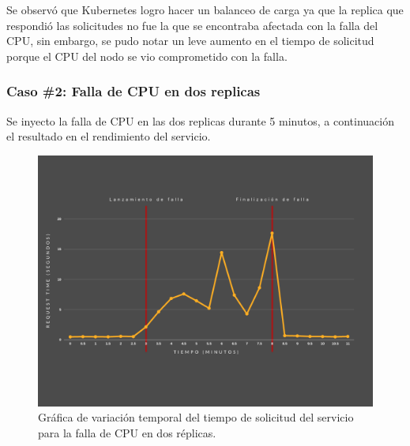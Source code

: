 \par Se observ\'o que Kubernetes logro hacer un balanceo de carga ya que la replica que respondió las solicitudes no fue la que se encontraba afectada con la falla del CPU, sin embargo, se pudo notar un leve aumento en el tiempo de solicitud porque el CPU del nodo se vio comprometido con la falla.\\





\subsubsection{Caso \#2: Falla de CPU en dos replicas}

\par Se inyecto la falla de CPU en las dos replicas durante 5 minutos, a continuación el resultado en el rendimiento del servicio.\\

\begin{figure}[htpb!]
	\centering
	\includegraphics[width=0.95\columnwidth]{images/graficasexperimentos/CPU2.png}
	\caption{Gráfica de variación temporal del tiempo de solicitud del servicio para la falla de CPU en dos r\'eplicas.}
	\label{fig:cpu02}
\end{figure}

